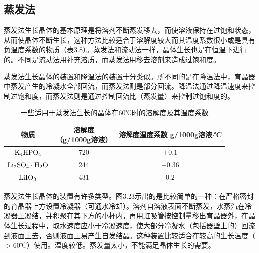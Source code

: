 ﻿\subsection{蒸发法}
蒸发法生长晶体的基本原理是将溶剂不断蒸发移去，而使溶液保持在过饱和状态，从而使晶体不断生长，这种方法比较适合于溶解度较大而其温度系数很小或是具有负温度系数的物质（表3.8）。蒸发法和流动法一样，晶体生长也是在恒温下进行的。不同是流动法用补充溶质，而蒸发法用移去溶剂来造成过饱和度。

蒸发法生长晶体的装置和降温法的装置十分类似。所不同的是在降温法中，育晶器中蒸发产生的冷凝水全部回流，而蒸发法则是部分回流。降温法通过降温速度来控制过饱和度，而蒸发法则是通过控制回流比（蒸发量）来控制过饱和度的。

\begin{table}[h]
\centering
\caption{一些适用于蒸发法生长的晶体在60℃时的溶解度及其温度系数}
\begin{tabular}{c|c|c}\toprule
物质 & \tabincell{c}{溶解度\\（g/1000g溶液）} & \tabincell{c}{溶解度温度系数\\g/1000g溶液$\cdot$℃}\\\hline
$\rm K_4HPO_4$ & 720 & $+0.1$\\
$\rm Li_2SO_4\cdot H_2O$ & 244 & $-0.36$\\
$\rm LiIO_3$ & 431 & $0.2$\\
\bottomrule
\end{tabular}
\end{table}

蒸发法生长晶体的装置有许多类型。图3.23示出的是比较简单的一种：在严格密封的育晶器上方设置冷凝器（可通水冷却）。溶剂自溶液表面不断蒸发，水蒸汽在冷凝器上凝结，并积聚在其下方的小杯内，再用虹吸管按控制量移出育晶器外，在晶体生长过程中，取水速度应小于冷凝速度，使大部分冷凝水（包括器壁上的）回流到液面上去，否则液面上易产生自发结晶。这种装置比较适合在较高的生长温度（$>$60℃）使用。温度较低。蒸发量太小，不能满足晶体生长的需要。

